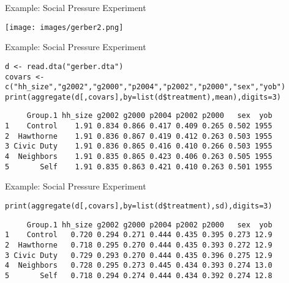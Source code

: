 \documentclass{beamer}
\numberwithin{equation}{section}
\begin{document}
\begin{frame}{Example: Social Pressure Experiment}

\centering
  \texttt{[image: images/gerber2.png]}

\end{frame}

\begin{frame}[fragile]{Example: Social Pressure Experiment}

\footnotesize

\begin{verbatim}
d <- read.dta("gerber.dta")
covars <- c("hh_size","g2002","g2000","p2004","p2002","p2000","sex","yob")
print(aggregate(d[,covars],by=list(d$treatment),mean),digits=3)
\end{verbatim}

\pause

\begin{verbatim}
     Group.1 hh_size g2002 g2000 p2004 p2002 p2000   sex  yob
1    Control    1.91 0.834 0.866 0.417 0.409 0.265 0.502 1955
2  Hawthorne    1.91 0.836 0.867 0.419 0.412 0.263 0.503 1955
3 Civic Duty    1.91 0.836 0.865 0.416 0.410 0.266 0.503 1955
4  Neighbors    1.91 0.835 0.865 0.423 0.406 0.263 0.505 1955
5       Self    1.91 0.835 0.863 0.421 0.410 0.263 0.501 1955
\end{verbatim}

\end{frame}

\begin{frame}[fragile]{Example: Social Pressure Experiment}

\footnotesize

\begin{verbatim}
print(aggregate(d[,covars],by=list(d$treatment),sd),digits=3)
\end{verbatim}

\pause

\begin{verbatim}
     Group.1 hh_size g2002 g2000 p2004 p2002 p2000   sex  yob
1    Control   0.720 0.294 0.271 0.444 0.435 0.395 0.273 12.9
2  Hawthorne   0.718 0.295 0.270 0.444 0.435 0.393 0.272 12.9
3 Civic Duty   0.729 0.293 0.270 0.444 0.435 0.396 0.275 12.9
4  Neighbors   0.728 0.295 0.273 0.445 0.434 0.393 0.274 13.0
5       Self   0.718 0.294 0.274 0.444 0.434 0.392 0.274 12.8
\end{verbatim}

\end{frame}
\end{document}
